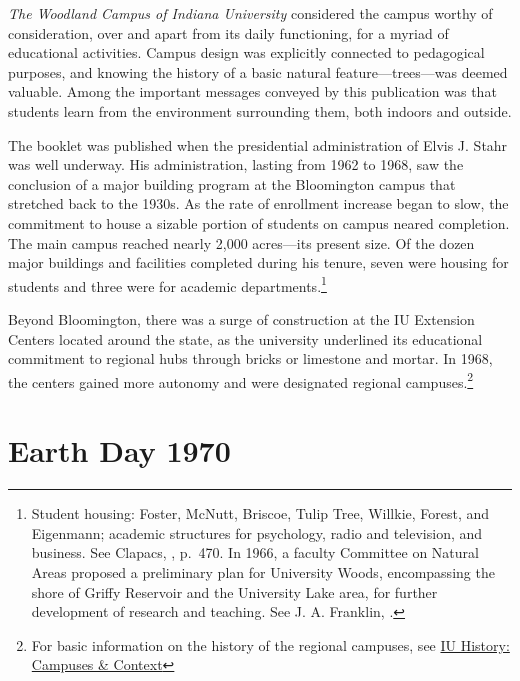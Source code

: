\documentclass[
  american,
  letterpaper,
]{scrreprt}
\begin{document}
\emph{The Woodland Campus of Indiana University} considered the campus
worthy of consideration, over and apart from its daily functioning, for
a myriad of educational activities. Campus design was explicitly
connected to pedagogical purposes, and knowing the history of a basic
natural feature---trees---was deemed valuable. Among the important
messages conveyed by this publication was that students learn from the
environment surrounding them, both indoors and outside.

The booklet was published when the presidential administration of Elvis
J. Stahr was well underway. His administration, lasting from 1962 to
1968, saw the conclusion of a major building program at the Bloomington
campus that stretched back to the 1930s. As the rate of enrollment
increase began to slow, the commitment to house a sizable portion of
students on campus neared completion. The main campus reached nearly
2,000 acres---its present size. Of the dozen major buildings and
facilities completed during his tenure, seven were housing for students
and three were for academic departments.\footnote{Student housing:
  Foster, McNutt, Briscoe, Tulip Tree, Willkie, Forest, and Eigenmann;
  academic structures for psychology, radio and television, and
  business. See Clapacs, , p.~470. In 1966, a faculty Committee on
  Natural Areas proposed a preliminary plan for University Woods,
  encompassing the shore of Griffy Reservoir and the University Lake
  area, for further development of research and teaching. See J. A.
  Franklin, .}

Beyond Bloomington, there was a surge of construction at the IU
Extension Centers located around the state, as the university underlined
its educational commitment to regional hubs through bricks or limestone
and mortar. In 1968, the centers gained more autonomy and were
designated regional campuses.\footnote{For basic information on the
  history of the regional campuses, see
  \href{https://expand.iu.edu/browse/iuheritage/courses/iu-history-campuses-context}{IU
  History: Campuses \& Context}}

\section{Earth Day 1970}\label{earth-day-1970}
\end{document}
